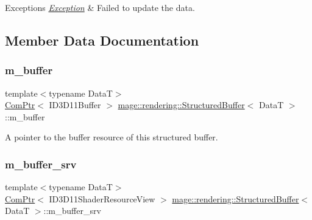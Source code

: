 \begin{DoxyExceptions}{Exceptions}
{\em \hyperlink{classmage_1_1_exception}{Exception}} & Failed to update the data. \\
\hline
\end{DoxyExceptions}


\subsection{Member Data Documentation}
\hypertarget{classmage_1_1rendering_1_1_structured_buffer_a9bc484869ba3102e1e392438a2f3adeb}{}\label{classmage_1_1rendering_1_1_structured_buffer_a9bc484869ba3102e1e392438a2f3adeb} 
\subsubsection{\texorpdfstring{m\+\_\+buffer}{m\_buffer}}
{\footnotesize\ttfamily template$<$typename DataT$>$ \\
\hyperlink{namespacemage_ae74f374780900893caa5555d1031fd79}{Com\+Ptr}$<$ I\+D3\+D11\+Buffer $>$ \hyperlink{classmage_1_1rendering_1_1_structured_buffer}{mage\+::rendering\+::\+Structured\+Buffer}$<$ DataT $>$\+::m\+\_\+buffer\hspace{0.3cm}{\ttfamily [private]}}

A pointer to the buffer resource of this structured buffer. \hypertarget{classmage_1_1rendering_1_1_structured_buffer_a07e3cc7dab6b293b084afb6b1fa8b035}{}\label{classmage_1_1rendering_1_1_structured_buffer_a07e3cc7dab6b293b084afb6b1fa8b035} 
\subsubsection{\texorpdfstring{m\+\_\+buffer\+\_\+srv}{m\_buffer\_srv}}
{\footnotesize\ttfamily template$<$typename DataT$>$ \\
\hyperlink{namespacemage_ae74f374780900893caa5555d1031fd79}{Com\+Ptr}$<$ I\+D3\+D11\+Shader\+Resource\+View $>$ \hyperlink{classmage_1_1rendering_1_1_structured_buffer}{mage\+::rendering\+::\+Structured\+Buffer}$<$ DataT $>$\+::m\+\_\+buffer\+\_\+srv\hspace{0.3cm}{\ttfamily [private]}}

